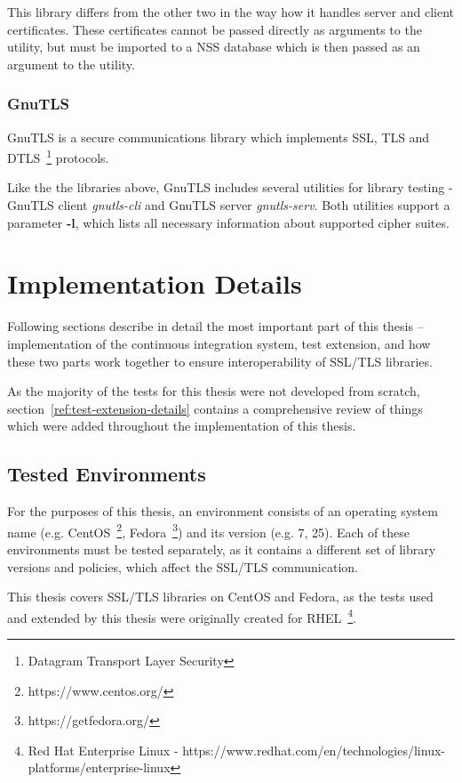     This library differs from the other two in the way how it handles
    server and client certificates. These certificates cannot be passed
    directly as arguments to the utility, but must be imported to a NSS
    database which is then passed as an argument to the utility.

\subsection{GnuTLS}
    GnuTLS is a secure communications library which implements SSL, TLS and
    DTLS~\footnote{Datagram Transport Layer Security} protocols.

    Like the the libraries above, GnuTLS includes several utilities for library
    testing - GnuTLS client \textit{gnutls-cli} and GnuTLS server
    \textit{gnutls-serv}. Both utilities support a parameter \textbf{-l},
    which lists all necessary information about supported cipher suites.


\chapter{Implementation Details} \label{chap:implementation_details}
    Following sections describe in detail the most important part of this thesis
    -- implementation of the continuous integration system, test extension,
    and how these two parts work together to ensure interoperability of
    SSL/TLS libraries.

    As the majority of the tests for this thesis were not developed from scratch,
    section~\ref{ref:test-extension-details}
    contains a comprehensive review of things which were added
    throughout the implementation of this thesis.

\section{Tested Environments}
    For the purposes of this thesis, an environment consists of an operating
    system name (e.g.
    CentOS~\footnote{https://www.centos.org/},
    Fedora~\footnote{https://getfedora.org/}) and its version
    (e.g. 7, 25). Each of these environments must be tested separately, as
    it contains a different set of library versions and policies, which
    affect the SSL/TLS communication.

    This thesis covers SSL/TLS libraries on CentOS and Fedora, as the tests used
    and extended by this thesis were originally created for
    RHEL~\footnote{Red Hat Enterprise Linux -
    https://www.redhat.com/en/technologies/linux-platforms/enterprise-linux}.


